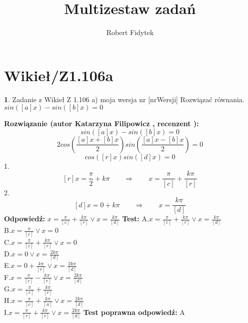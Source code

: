 \documentclass[12pt, a4paper]{article}
\title{Multizestaw zadań}
\author{Robert Fidytek}
\date{}
\theoremstyle{definition} %
\newtheorem{zad}{}
\newcommand{\kategoria}[1]{\section{#1}} %
\newcommand{\zadStart}[1]{\begin{zad}#1\newline} %
\newcommand{\zadStop}{\end{zad}}   %
\newcommand{\rozwStart}[2]{\noindent \textbf{Rozwiązanie (autor #1 , recenzent #2): }\newline} %
\newcommand{\rozwStop}{\newline}                                            %
\newcommand{\odpStart}{\noindent \textbf{Odpowiedź:}\newline}    %
\newcommand{\odpStop}{\newline}                                             %
\newcommand{\testStart}{\noindent \textbf{Test:}\newline} %
\newcommand{\testStop}{\newline} %
\newcommand{\kluczStart}{\noindent \textbf{Test poprawna odpowiedź:}\newline} %
\newcommand{\kluczStop}{\newline} %
\begin{document}
\maketitle


\kategoria{Wikieł/Z1.106a}
\zadStart{Zadanie z Wikieł Z 1.106 a) moja wersja nr [nrWersji]}
Rozwiązać równania.\\
 $sin([a]x)-sin([b]x)=0$
\zadStop
\rozwStart{Katarzyna Filipowicz}{}
$$
sin([a]x)-sin([b]x)=0
$$
$$
2cos\left(\frac{[a]x+[b]x}{2}\right)sin\left(\frac{[a]x-[b]x}{2}\right)=0
$$ $$
cos([r]x)sin([d]x)=0
$$
1.
 $$
[r]x=\frac{\pi}{2}+k\pi \qquad \Rightarrow \qquad x=\frac{\pi}{[c]}+\frac{k\pi}{[r]}
$$
2.
$$
[d]x=0+k\pi  \qquad \Rightarrow \qquad x=\frac{k\pi}{[d]}
$$
\rozwStop
\odpStart
$x=\frac{\pi}{[c]}+\frac{k\pi}{[r]}  \vee x=\frac{k\pi}{[d]}$
\odpStop
\testStart
A.$x=\frac{\pi}{[c]}+\frac{k\pi}{[r]}  \vee x=\frac{k\pi}{[d]}$\\
B.$x=\frac{\pi}{[c]}  \vee x=0$\\
C.$x=\frac{\pi}{[c]}+\frac{k\pi}{[r]}  \vee x=0$\\
D.$x=0  \vee x=\frac{2k\pi}{[d]}$\\
E.$x=0+\frac{k\pi}{[r]}  \vee x=\frac{2k\pi}{[d]}$\\
F.$x=\frac{\pi}{[c]}-\frac{k\pi}{[r]}  \vee x=\frac{2k\pi}{[d]}$\\
G.$x=\frac{\pi}{[c]}+\frac{k\pi}{[r]} $\\
H.$x=\frac{\pi}{[c]}+\frac{k\pi}{[a]}  \vee x=\frac{2k\pi}{[d]}$\\
I.$x=\frac{\pi}{[r]}+\frac{k\pi}{[r]}  \vee x=\frac{2k\pi}{[d]}$
\testStop
\kluczStart
A
\kluczStop
\end{document}
